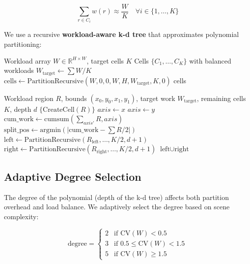 \documentclass[11pt,a4paper]{article}
\begin{document}
\begin{equation}
\sum_{r \in C_i} w(r) \approx \frac{W}{K} \quad \forall i \in \{1, \ldots, K\}
\end{equation}

We use a recursive \textbf{workload-aware k-d tree} that approximates polynomial partitioning:

\begin{algorithm}[H]
\caption{Workload-Aware Partitioning}
\begin{algorithmic}[1]
\REQUIRE Workload array $W \in \mathbb{R}^{H \times W}$, target cells $K$
\ENSURE Cells $\{C_1, \ldots, C_K\}$ with balanced workloads
\STATE $W_{\text{target}} \leftarrow \sum W / K$
\STATE $\text{cells} \leftarrow \text{PartitionRecursive}(W, 0, 0, W, H, W_{\text{target}}, K, 0)$
\RETURN cells
\end{algorithmic}
\end{algorithm}

\begin{algorithm}[H]
\caption{PartitionRecursive}
\begin{algorithmic}[1]
\REQUIRE Workload region $R$, bounds $(x_0, y_0, x_1, y_1)$, target work $W_{\text{target}}$, remaining cells $K$, depth $d$
    \RETURN $\{\text{CreateCell}(R)\}$
\ENDIF
\STATE {}
    \STATE $axis \leftarrow x$
\ELSE
    \STATE $axis \leftarrow y$
\ENDIF
\STATE {}
\STATE $\text{cum\_work} \leftarrow \text{cumsum}(\sum_{axis'} R, axis)$
\STATE $\text{split\_pos} \leftarrow \text{argmin}(|\text{cum\_work} - \sum R / 2|)$
\STATE {}
\STATE $\text{left} \leftarrow \text{PartitionRecursive}(R_{\text{left}}, \ldots, K/2, d+1)$
\STATE $\text{right} \leftarrow \text{PartitionRecursive}(R_{\text{right}}, \ldots, K/2, d+1)$
\RETURN $\text{left} \cup \text{right}$
\end{algorithmic}
\end{algorithm}

\subsection{Adaptive Degree Selection}

The degree of the polynomial (depth of the k-d tree) affects both partition overhead and load balance. We adaptively select the degree based on scene complexity:

\begin{equation}
\text{degree} = \begin{cases}
2 & \text{if } \text{CV}(W) < 0.5 \\
3 & \text{if } 0.5 \leq \text{CV}(W) < 1.5 \\
5 & \text{if } \text{CV}(W) \geq 1.5
\end{cases}
\end{equation}
\end{document}
